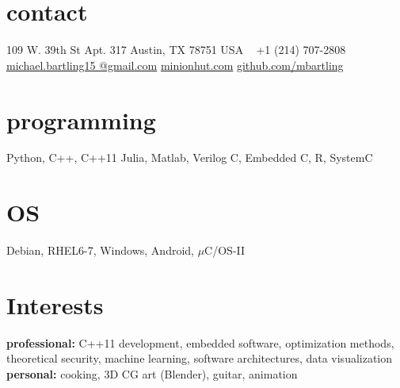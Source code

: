 \documentclass[]{friggeri-cv} %
\begin{document}

\begin{aside} %
\section{contact}
109 W. 39th St
Apt. 317
Austin, TX 78751
USA
~
+1 (214) 707-2808
~
\href{mailto:michael.bartling15@gmail.com}{michael.bartling15
@gmail.com}
\href{http://www.minionhut.com}{minionhut.com}
\href{http://github.com/mbartling}{github.com/mbartling}
\section{programming}
{%
Python, C++, C++11
Julia, Matlab, Verilog
C, Embedded C, R, SystemC}
\section{OS}
Debian, RHEL6-7,
Windows, Android,
$\mu$C/OS-II
\end{aside}

\section{Interests}

\textbf{professional:} C++11 development, embedded software, optimization methods, theoretical security, machine learning, software architectures, data visualization \\ \textbf{personal:} cooking, 3D CG art (Blender), guitar, animation 
\end{document}
